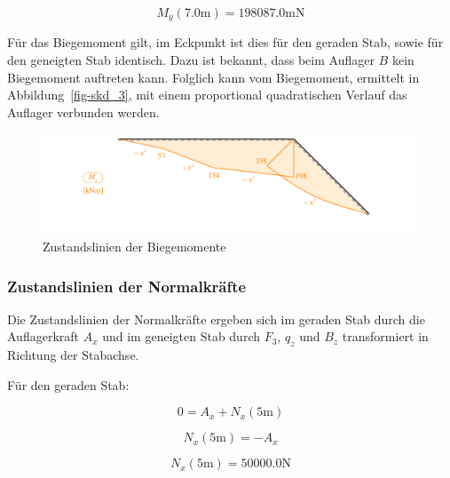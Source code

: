 \documentclass[
  12pt,
  letterpaper,
  DIV=11,
  egregdoesnotlikesansseriftitles]{scrartcl}
\begin{document}
\begin{equation}M_{y}{\left(7.0 \text{m} \right)} = 198087.0 \text{m} \text{N}\end{equation}

Für das Biegemoment gilt, im Eckpunkt ist dies für den geraden Stab,
sowie für den geneigten Stab identisch. Dazu ist bekannt, dass beim
Auflager \(B\) kein Biegemoment auftreten kann. Folglich kann vom
Biegemoment, ermittelt in Abbildung~\ref{fig-skd_3}, mit einem
proportional quadratischen Verlauf das Auflager verbunden werden.

\begin{figure}[H]

{\centering \includegraphics{BSI_HS23_Testat_02_files/mediabag/../images/Testat_02_HS23_My.pdf}

}

\caption{\label{fig-my}Zustandslinien der Biegemomente}

\end{figure}

\hypertarget{zustandslinien-der-normalkruxe4fte}{%
\subsubsection{Zustandslinien der
Normalkräfte}\label{zustandslinien-der-normalkruxe4fte}}

Die Zustandslinien der Normalkräfte ergeben sich im geraden Stab durch
die Auflagerkraft \(A_x\) und im geneigten Stab durch \(F_3\), \(q_z\)
und \(B_z\) transformiert in Richtung der Stabachse.

Für den geraden Stab:

\begin{equation}0 = A_{x} + N_{x}{\left(5 \text{m} \right)}\end{equation}

\begin{equation}N_{x}{\left(5 \text{m} \right)} = - A_{x}\end{equation}

\begin{equation}N_{x}{\left(5 \text{m} \right)} = 50000.0 \text{N}\end{equation}
\end{document}
